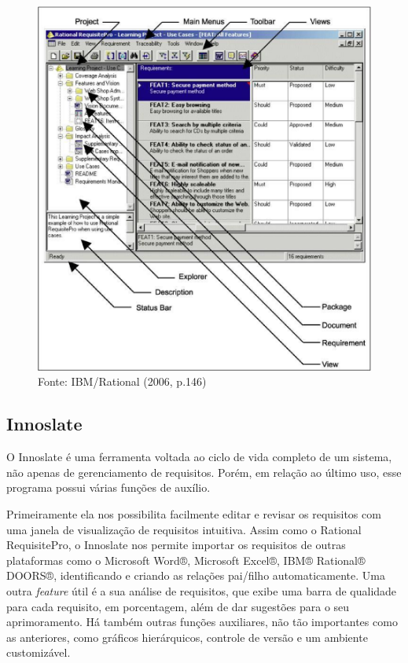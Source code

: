 \begin{figure}[htb]
\centering
  \includegraphics[keepaspectratio=true,scale=0.5]
  {figuras/requisit_pro.eps}
  \caption{Fonte: IBM/Rational (2006, p.146)}
  \label{requisit-pro}
\end{figure}

\clearpage{}

\subsection{Innoslate}

O Innoslate é uma ferramenta voltada ao ciclo de vida completo de um sistema, não apenas de gerenciamento de requisitos. Porém, em relação ao último uso, esse programa possui várias funções de auxílio.

Primeiramente ela nos possibilita facilmente editar e revisar os requisitos com uma janela de visualização de requisitos intuitiva. Assim como o Rational RequisitePro, o Innoslate nos permite importar os requisitos de outras plataformas como o Microsoft Word®, Microsoft Excel®, IBM® Rational® DOORS®, identificando e criando as relações pai/filho automaticamente. Uma outra \textit{feature} útil é a sua análise de requisitos, que exibe uma barra de qualidade para cada requisito, em porcentagem, além de dar sugestões para o seu aprimoramento. Há também outras funções auxiliares, não tão importantes como as anteriores, como gráficos hierárquicos, controle de versão e um ambiente customizável.


